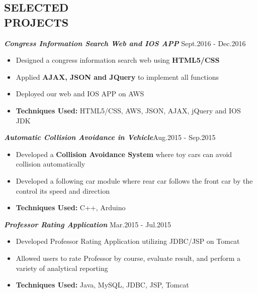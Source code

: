 \documentclass[line,margin]{res}
\begin{document}
\begin{resume}
\section{SELECTED \\ PROJECTS}
           {\sl \textbf{Congress Information Search Web and IOS APP}}           \hfill Sept.2016 - Dec.2016 \\[1mm]
             \vspace{-5mm}
             \begin{itemize}
	\item Designed a congress information search web using \textbf{HTML5/CSS}		
	\item Applied \textbf{AJAX, JSON and JQuery} to implement all functions
	\item Deployed our web and IOS APP on AWS
		\item \textbf{Techniques Used:} HTML5/CSS, AWS, JSON, AJAX, jQuery and IOS JDK
             \end{itemize}
             \vspace{-3mm}
            {\sl \textbf{Automatic Collision Avoidance in Vehicle}}\hfill Aug.2015 - Sep.2015 \\[1mm]
            \vspace{-5mm}
             \begin{itemize}
	\item Developed a \textbf{Collision Avoidance System} where toy cars can avoid collision automatically
	\item Developed a following car module where rear car follows the front car by the control its speed and direction
	\item \textbf{Techniques Used:} C++, Arduino
             \end{itemize}
             \vspace{-3mm}
             {\sl \textbf{Professor Rating Application}} \hfill Mar.2015 - Jul.2015 \\[1mm]
             \vspace{-5mm}
             \begin{itemize}
             \item Developed Professor Rating Application utilizing JDBC/JSP on Tomcat
             \item Allowed users to rate Professor by course, evaluate result, and perform a variety of analytical reporting
             \item \textbf{Techniques Used:} Java, MySQL, JDBC, JSP, Tomcat
             \end{itemize}
             

\end{resume}
\end{document}
